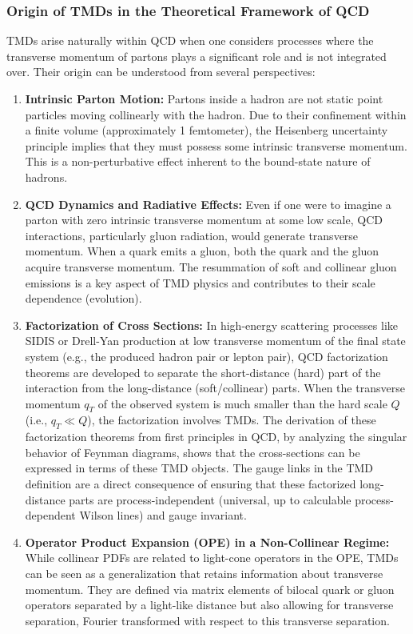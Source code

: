 \documentclass[11pt]{article}
\begin{document}
\subsubsection{Origin of TMDs in the Theoretical Framework of QCD}

TMDs arise naturally within QCD when one considers processes where the transverse momentum of partons plays a significant role and is not integrated
over. Their origin can be understood from several perspectives:
\begin{enumerate}
  \item \textbf{Intrinsic Parton Motion:} Partons inside a hadron are not static point particles moving collinearly with the hadron. Due to their confinement within a finite volume (approximately 1 femtometer), the Heisenberg uncertainty principle implies that they must possess some intrinsic transverse momentum. This is a non-perturbative effect inherent to the bound-state nature of hadrons.
  \item \textbf{QCD Dynamics and Radiative Effects:} Even if one were to imagine a parton with zero intrinsic transverse momentum at some low scale, QCD interactions, particularly gluon radiation, would generate transverse momentum. When a quark emits a gluon, both the quark and the gluon acquire transverse momentum. The resummation of soft and collinear gluon emissions is a key aspect of TMD physics and contributes to their scale dependence (evolution).
  \item \textbf{Factorization of Cross Sections:} In high-energy scattering processes like SIDIS or Drell-Yan production at low transverse momentum of the final state system (e.g., the produced hadron pair or lepton pair), QCD factorization theorems are developed to separate the short-distance (hard) part of the interaction from the long-distance (soft/collinear) parts. When the transverse momentum $q_T$ of the observed system is much smaller than the hard scale $Q$ (i.e., $q_T \ll Q$), the factorization involves TMDs. The derivation of these factorization theorems from first principles in QCD, by analyzing the singular behavior of Feynman diagrams, shows that the cross-sections can be expressed in terms of these TMD objects. The gauge links in the TMD definition are a direct consequence of ensuring that these factorized long-distance parts are process-independent (universal, up to calculable process-dependent Wilson lines) and gauge invariant.
  \item \textbf{Operator Product Expansion (OPE) in a Non-Collinear Regime:} While collinear PDFs are related to light-cone operators in the OPE, TMDs can be seen as a generalization that retains information about transverse momentum. They are defined via matrix elements of bilocal quark or gluon operators separated by a light-like distance but also allowing for transverse separation, Fourier transformed with respect to this transverse separation.
\end{enumerate}
\end{document}
